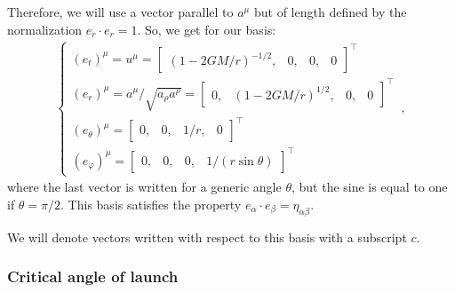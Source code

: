 \documentclass[main.tex]{subfiles}
\begin{document}
Therefore, we will use a vector parallel to \(a^{\mu }\) but of length defined by the normalization \(e_{r} \cdot e_{r} = 1\). So, we get for our basis: 
%
\begin{subequations}
\begin{align}
  \begin{cases}
    (e_{t})^{\mu } = u^{\mu } = \left[\begin{array}{cccc}
    (1-2GM/r)^{-1/2}, & 0, & 0, & 0
  \end{array}\right]^{\top} \\ 
    (e_{r})^{\mu } = a^{\mu } / \sqrt{a_{\rho } a^{\rho }}
  = \left[\begin{array}{cccc}
    0, & (1-2GM/r)^{1/2}, & 0, & 0
  \end{array}\right]^{\top}  \\
  (e_{\theta })^{\mu } = \left[\begin{array}{cccc}
  0, & 0, & 1/r, & 0
  \end{array}\right]^{\top} \\
  (e_{\varphi })^{\mu } = \left[\begin{array}{cccc}
  0, & 0, & 0, & 1/(r \sin \theta )
  \end{array}\right]^{\top}
\end{cases} 
\,,
\end{align}
\end{subequations}
%
where the last vector is written for a generic angle \(\theta \), but the sine is equal to one if \(\theta = \pi /2\). 
This basis satisfies the property \(e_{\alpha } \cdot e_{\beta } = \eta_{\alpha \beta }\). 

We will denote vectors written with respect to this basis with a subscript \(c\). 

\subsubsection{Critical angle of launch}
\end{document}
